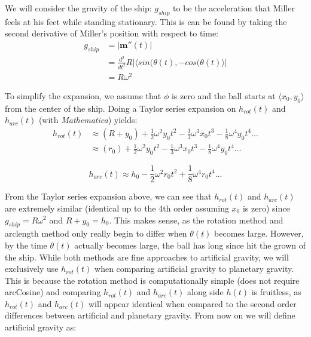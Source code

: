 \documentclass{amsart}
\renewcommand{\vec}{\textbf}
\theoremstyle{definition}
\begin{document}
We will consider the gravity of the ship: $g_{ship}$  to be the acceleration that Miller feels at his feet while standing stationary. This is can be found by taking the second derivative of Miller's position with respect to time:
\begin{equation}
\begin{split}
     g_{ship}&=\lvert\vec{m}''(t)\rvert \\
     &= \frac{d^2}{dt^2}R\lvert \langle sin(\theta(t),-cos(\theta(t)\rangle \rvert \\
     &=R \omega^2
\end{split}
\end{equation}

To simplify the expansion, we assume that  $\phi$ is zero and the ball starts at $\langle x_0,y_0\rangle$ from the center of the ship. Doing a Taylor series expansion on $h_{rot}(t)$ and $h_{arc}(t)$ (with \textsl{Mathematica}) yields:
\begin{equation}
\begin{split}
     h_{rot}(t) &\approx (R+y_0)+\frac{1}{2}\omega^2 y_0 t^2 - \frac{1}{3}\omega^3 x_0 t^3 -\frac{1}{8}\omega^4 y_0 t^4... \\
     &\approx (r_0)+\frac{1}{2}\omega^2 y_0 t^2 - \frac{1}{3}\omega^3 x_0 t^3 -\frac{1}{8}\omega^4 y_0 t^4...
\end{split}
\end{equation}

\begin{equation}
 h_{arc}(t) \approx h_0 -\frac{1}{2}\omega^2 r_0 t^2 + \frac{1}{8}\omega^4 r_0 t^4 ...
\end{equation}

From the Taylor series expansion above, we can see that $h_{rot}(t)$
and $h_{arc}(t)$ are extremely similar (identical up to the 4th order
assuming $x_0$ is zero) since $g_{ship} = R \omega^2$ and $R+y_0 =
h_0$. This makes sense, as the rotation method and arclength method
only really begin to differ when $\theta(t)$ becomes large. However,
by the time $\theta(t)$ actually becomes large, the ball has long
since hit the grown of the ship. While both methods are fine
approaches to artificial gravity, we will exclusively use $h_{rot}(t)$
when comparing artificial gravity to planetary gravity. This is
because the rotation method is computationally simple (does not
require arcCosine) and comparing $h_{rot}(t)$ and $h_{arc}(t)$ along
side $h(t)$ is fruitless, as $h_{rot}(t)$ and $h_{arc}(t)$ will appear
identical when compared to the second order differences between
artificial and planetary gravity. From now on we will define
artificial gravity as:
\end{document}
